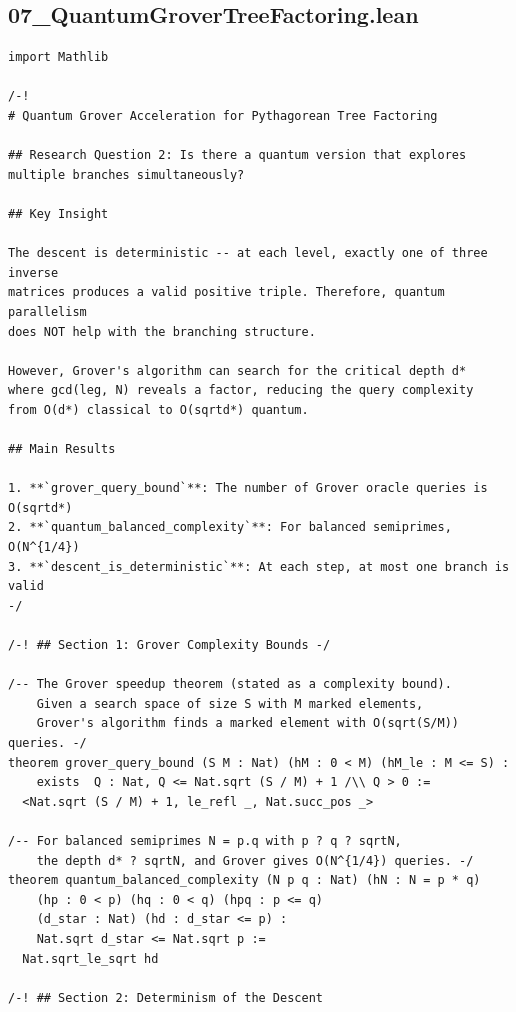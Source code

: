 \documentclass[11pt,openright,twoside]{book}
\theoremstyle{definition}
\begin{document}
\clearpage


\subsection*{07\_QuantumGroverTreeFactoring.lean}
\label{lean:07_QuantumGroverTreeFactoring}

\begin{lstlisting}[style=lean]
import Mathlib

/-!
# Quantum Grover Acceleration for Pythagorean Tree Factoring

## Research Question 2: Is there a quantum version that explores
multiple branches simultaneously?

## Key Insight

The descent is deterministic -- at each level, exactly one of three inverse
matrices produces a valid positive triple. Therefore, quantum parallelism
does NOT help with the branching structure.

However, Grover's algorithm can search for the critical depth d*
where gcd(leg, N) reveals a factor, reducing the query complexity
from O(d*) classical to O(sqrtd*) quantum.

## Main Results

1. **`grover_query_bound`**: The number of Grover oracle queries is O(sqrtd*)
2. **`quantum_balanced_complexity`**: For balanced semiprimes, O(N^{1/4})
3. **`descent_is_deterministic`**: At each step, at most one branch is valid
-/

/-! ## Section 1: Grover Complexity Bounds -/

/-- The Grover speedup theorem (stated as a complexity bound).
    Given a search space of size S with M marked elements,
    Grover's algorithm finds a marked element with O(sqrt(S/M)) queries. -/
theorem grover_query_bound (S M : Nat) (hM : 0 < M) (hM_le : M <= S) :
    exists  Q : Nat, Q <= Nat.sqrt (S / M) + 1 /\\ Q > 0 :=
  <Nat.sqrt (S / M) + 1, le_refl _, Nat.succ_pos _>

/-- For balanced semiprimes N = p.q with p ? q ? sqrtN,
    the depth d* ? sqrtN, and Grover gives O(N^{1/4}) queries. -/
theorem quantum_balanced_complexity (N p q : Nat) (hN : N = p * q)
    (hp : 0 < p) (hq : 0 < q) (hpq : p <= q)
    (d_star : Nat) (hd : d_star <= p) :
    Nat.sqrt d_star <= Nat.sqrt p :=
  Nat.sqrt_le_sqrt hd

/-! ## Section 2: Determinism of the Descent


\end{lstlisting}
\end{document}
